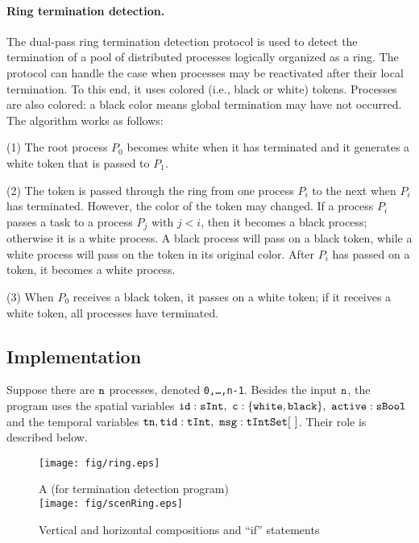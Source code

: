 \documentclass[runningheads]{llncs}
\newcommand{\1}{\u{a}}
\newcommand{\2}{\c{s}}
\newcommand{\5}{\c{t}}
\newcommand{\8}{\^{\i}}
\newcommand{\9}{\^{a}}
\begin{document}
\paragraph{Ring termination detection.}

The dual-pass ring termination detection protocol is used to detect the termination of a pool of distributed
processes logically organized as a ring.  The protocol can handle the case when processes may be reactivated
after their local termination. To this end, it uses colored (i.e., black or white) tokens. Processes are also
colored: a black color means global termination may have not occurred. The algorithm works as follows:

(1) The root process $P_0$ becomes white when it has terminated and it generates a white token that is passed
to $P_1$.

(2) The token is passed through the ring from one process $P_i$ to the next when $P_i$ has
terminated. However, the color of the token may changed. If a process $P_i$ passes a task to a process $P_j$
with $j<i$, then it becomes a black process; otherwise it is a white process. A black process will pass on a
black token, while a white process will pass on the token in its original color. After $P_i$ has passed on a
token, it becomes a white process.

(3) When $P_0$ receives a black token, it passes on a white token; if it receives a white token, all
processes have terminated.

\subsection{Implementation}
 
Suppose there are ${\tt n}$ processes, denoted {\tt 0,\dots,n-1}.  Besides the input ${\tt n}$, the program
uses the spatial variables ${\tt id : sInt,\ c : \{white,black\},\ active : sBool}$ and the temporal variables
${\tt tn, tid : tInt,\ msg : tIntSet[~]}$. Their role is described below.

\begin{figure}${}$\hfill{\texttt{[image: fig/ring.eps]}}\vspace{-4.cm}\\ 
\begin{center}\hspace*{-2cm}A  (for termination detection program)\\
\texttt{[image: fig/scenRing.eps]}\vspace{-.4cm}\end{center}
\caption{Vertical and horizontal compositions and ``if'' statements}
\label{scen-termin}\end{figure}
\end{document}
